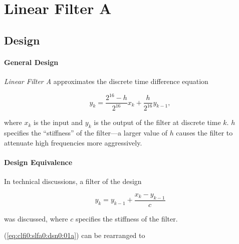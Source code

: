\section{Linear Filter A}
\label{clfi0:slfa0}


\subsection{Design}
\label{clfi0:slfa0:dsn0}


\paragraph{General Design}

\emph{Linear Filter A} approximates the
discrete time difference equation

\begin{equation}
\label{eq:clfi0:slfa0:dsn0:01}
y_{k} = \frac{2^{16}-h}{2^{16}}x_k + \frac{h}{2^{16}}y_{k-1},
\end{equation}

\noindent{}where $x_k$ is the input and $y_k$ is the output
of the filter at discrete time $k$.
$h$ specifies the ``stiffness'' of the filter---a 
larger value of $h$ causes the filter to attenuate high frequencies more
aggressively.


\paragraph{Design Equivalence}

In technical discussions, a filter of the design

\begin{equation}
\label{eq:clfi0:slfa0:dsn0:01a}
y_{k} = y_{k-1} + \frac{x_k - y_{k-1}}{c}
\end{equation}

\noindent{}was discussed, where $c$ specifies the
stiffness of the filter.

(\ref{eq:clfi0:slfa0:dsn0:01a}) can be rearranged to

